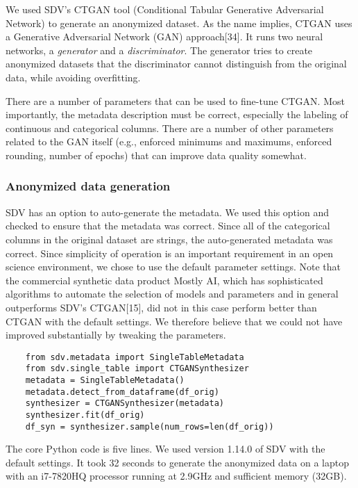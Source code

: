 \documentclass[10pt]{article}
\newcommand{\mycite}[1]{[#1]}
\begin{document}
We used SDV's CTGAN tool (Conditional Tabular Generative Adversarial Network) to generate an anonymized dataset.  As the name implies, CTGAN uses a Generative Adversarial Network (GAN) approach\mycite{34}. It runs two neural networks, a \textit{generator} and a \textit{discriminator}. The generator tries to create anonymized datasets that the discriminator cannot distinguish from the original data, while avoiding overfitting.

There are a number of parameters that can be used to fine-tune CTGAN. Most importantly, the metadata description must be correct, especially the labeling of continuous and categorical columns. There are a number of other parameters related to the GAN itself (e.g., enforced minimums and maximums, enforced rounding, number of epochs) that can improve data quality somewhat.

\subsubsection*{Anonymized data generation}

SDV has an option to auto-generate the metadata. We used this option and checked to ensure that the metadata was correct. Since all of the categorical columns in the original dataset are strings, the auto-generated metadata was correct. Since simplicity of operation is an important requirement in an open science environment, we chose to use the default parameter settings. Note that the commercial synthetic data product Mostly AI, which has sophisticated algorithms to automate the selection of models and parameters and in general outperforms SDV's CTGAN\mycite{15}, did not in this case perform better than CTGAN with the default settings. We therefore believe that we could not have improved substantially by tweaking the parameters.

{\small 
\begin{verbatim}
    from sdv.metadata import SingleTableMetadata
    from sdv.single_table import CTGANSynthesizer
    metadata = SingleTableMetadata()
    metadata.detect_from_dataframe(df_orig)
    synthesizer = CTGANSynthesizer(metadata)
    synthesizer.fit(df_orig)
    df_syn = synthesizer.sample(num_rows=len(df_orig))
\end{verbatim}
}

The core Python code is five lines. We used version 1.14.0 of SDV with the default settings. It took 32 seconds to generate the anonymized data on a laptop with an i7-7820HQ processor running at 2.9GHz and sufficient memory (32GB).
\end{document}
